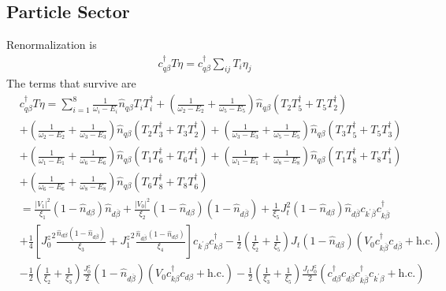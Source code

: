 \documentclass[twoside]{report}
\numberwithin{equation}{section}
\begin{document}
\subsection{Particle Sector}
Renormalization is
\begin{equation}\begin{aligned}
	c^\dagger_{q\beta}T \eta = c^\dagger_{q\beta}\sum_{ij}T_i \eta_j
\end{aligned}\end{equation}
The terms that survive are
\begin{equation}\begin{aligned}
& c^\dagger_{q\beta}T \eta
= \sum_{i=1}^8\frac{1}{\omega_i - E_i}\hat n_{q\beta} T_i T_i^\dagger +\left(\frac{1}{\omega_2 - E_2} + \frac{1}{\omega_5 - E_5}\right)\hat n_{q\beta} \left(T_2 T_5^\dagger + T_5 T_2^\dagger \right) \\
& +\left(\frac{1}{\omega_2 - E_2} + \frac{1}{\omega_3 - E_3}\right)\hat n_{q\beta} \left(T_2 T_3^\dagger + T_3 T_2^\dagger \right) + \left(\frac{1}{\omega_3 - E_3} + \frac{1}{\omega_5 - E_5}\right)\hat n_{q\beta} \left(T_3 T_5^\dagger + T_5 T_3^\dagger \right) \\
& + \left(\frac{1}{\omega_1 - E_1} + \frac{1}{\omega_6 - E_6}\right)\hat n_{q\beta} \left(T_1 T_6^\dagger + T_6 T_1^\dagger \right) + \left(\frac{1}{\omega_1 - E_1} + \frac{1}{\omega_8 - E_8}\right)\hat n_{q\beta} \left(T_1 T_8^\dagger + T_8 T_1^\dagger \right) \\
& + \left(\frac{1}{\omega_6 - E_6} + \frac{1}{\omega_8 - E_8}\right)\hat n_{q\beta} \left(T_6 T_8^\dagger + T_8 T_6^\dagger \right)\\
&=\frac{|V_1|^2}{\xi_1}\left( 1 - \hat n_{d\beta} \right) \hat n_{d\overline\beta} + \frac{|V_0|^2}{\xi_2}\left( 1 - \hat n_{d\beta} \right) \left( 1 - \hat n_{d\overline\beta} \right) + \frac{1}{\xi_5}J_t^2 \left( 1 - \hat n_{d\beta} \right) \hat n_{d\overline\beta} c_{k^\prime\overline\beta}c^\dagger_{k\overline\beta} \\
&+ \frac{1}{4}\left[ {J_0^z}^2\frac{\hat n_{d\beta}\left( 1 - \hat n_{d\overline\beta} \right) }{\xi_3} + {J_1^z}^2\frac{\hat n_{d\overline\beta}\left( 1 - \hat n_{d\beta} \right)}{\xi_4} \right]c_{k^\prime\beta}c^\dagger_{k\beta} - \frac{1}{2} \left(\frac{1}{\xi_2} + \frac{1}{\xi_5}\right)J_t\left( 1 - \hat n_{d\beta}\right) \left(V_0 c^\dagger_{k\overline\beta}c_{d\overline\beta} + \text{h.c.}\right) \\
&- \frac{1}{2}\left(\frac{1}{\xi_2} + \frac{1}{\xi_3}\right)\frac{J^z_0}{2}\left(1 - \hat n_{d\overline\beta}\right)\left(V_0 c^\dagger_{k\beta}c_{d\beta} + \text{h.c.}\right) - \frac{1}{2}\left(\frac{1}{\xi_3} + \frac{1}{\xi_5}\right)\frac{J_t J^z_0}{2}\left(c^\dagger_{d\beta}c_{d\overline\beta}c^\dagger_{k\overline\beta}c_{k^\prime\beta} + \text{h.c.}\right) \\

\end{aligned}
\end{equation}
\end{document}
